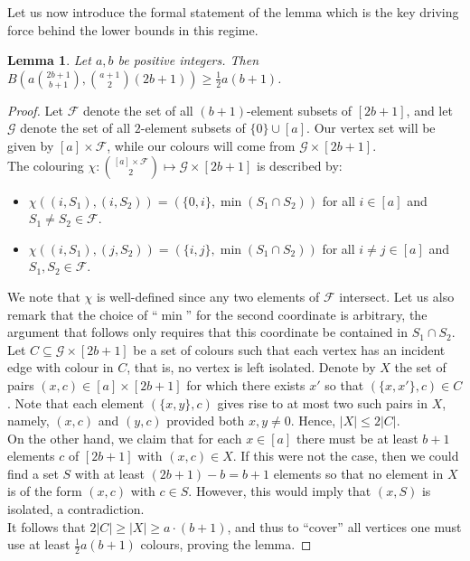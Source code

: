 \documentclass[11pt,a4paper]{article}
\newtheorem{lemma}[theorem]{Lemma}
\begin{document}
\noindent
Let us now introduce the formal statement of the lemma which is the key driving force behind the lower bounds in this regime.
\begin{lemma}
\label{lem:3:2}
Let $a, b$ be positive integers. Then $B\left(a\binom{2b+1}{b+1}, \binom{a+1}{2}(2b+1)\right) \geq \frac{1}{2}a(b+1)$.
\end{lemma}
\begin{proof}
Let $\mathcal F$ denote the set of all $(b+1)$-element subsets of $[2b+1]$, and let $\mathcal G$ denote the set of all $2$-element subsets of $\{0\} \cup[a]$.  Our vertex set will be given by $[a] \times \mathcal F$, while our colours will come from $\mathcal G \times [2b+1]$. \\

\noindent
The colouring $\chi : \binom{[a] \times \mathcal F}{2} \mapsto \mathcal G \times [2b+1]$ is described by:
\begin{itemize}
    \item $\chi((i, S_1), (i, S_2)) = (\{0,i\}, \min(S_1 \cap S_2))$ for all $i \in [a]$ and $S_1 \ne S_2 \in \mathcal F$.
    \item $\chi((i, S_1), (j, S_2)) = (\{i,j\}, \min(S_1 \cap S_2))$ for all $i \ne j \in [a]$ and $S_1, S_2 \in \mathcal F$.
\end{itemize}
We note that $\chi$ is well-defined since any two elements of $\mathcal F$ intersect. Let us also remark that the choice of ``$\min$'' for the second coordinate is arbitrary, the argument that follows only requires that this coordinate be contained in $S_1 \cap S_2$. \\

\noindent
Let $C \subseteq \mathcal{G} \times [2b+1]$ be a set of colours such that each vertex has an incident edge with colour in $C$, that is, no vertex is left isolated. Denote by $X$ the set of pairs $(x, c) \in [a] \times [2b+1]$ for which there exists $x'$ so that $(\{x, x'\}, c) \in C$. Note that each element $(\{x, y\}, c)$ gives rise to at most two such pairs in $X$, namely, $(x, c)$ and $(y, c)$ provided both $x, y \ne 0$. Hence, $|X| \leq 2|C|$. \\

\noindent
On the other hand, we claim that for each $x \in [a]$ there must be at least $b+1$ elements $c$ of $[2b+1]$ with $(x,c) \in X$. If this were not the case, then we could find a set $S$ with at least $(2b+1)-b = b+1$ elements so that no element in $X$ is of the form $(x, c)$ with $c \in S$. However, this would imply that $(x, S)$ is isolated, a contradiction. \\

\noindent
It follows that $2|C| \geq |X| \geq a \cdot (b+1)$, and thus to ``cover'' all vertices one must use at least $\frac{1}{2}a(b+1)$ colours, proving the lemma.
\end{proof}
\end{document}
